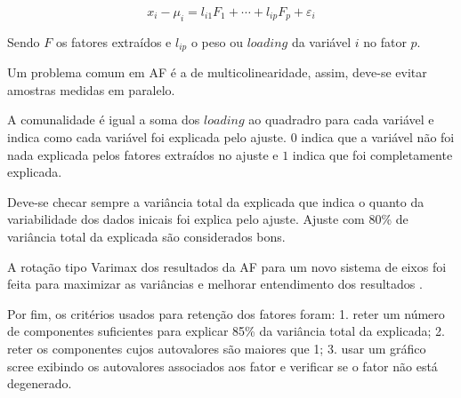 \begin{equation}
  \label{eq:af}
  x_i-\mu_i = l_{i1} F_1 + \cdots + l_{ip} F_p + \varepsilon_i 
\end{equation}

Sendo $F$ os fatores extraídos e $l_{ip}$ o peso ou $loading$ 
da variável $i$ no fator $p$.

Um problema comum em AF é a de multicolinearidade, assim, 
deve-se evitar amostras medidas em paralelo. 

A comunalidade é igual a soma dos $loading$ ao quadradro 
para cada variável e indica como cada variável foi explicada pelo ajuste. 
$0$ indica que a variável não foi nada explicada pelos fatores extraídos 
no ajuste e $1$ indica que foi completamente explicada.

Deve-se checar sempre a variância total da explicada que indica 
o quanto da variabilidade dos dados inicais foi explica pelo ajuste. 
Ajuste com 80\% de variância total da explicada são considerados bons. 

A rotação tipo Varimax dos resultados da AF 
para um novo sistema de eixos foi feita para maximizar as variâncias 
e melhorar entendimento dos resultados \citep{kaiser1958}.

Por fim, os critérios usados para retenção dos fatores foram:
1. reter um número de componentes suficientes para explicar 85\% da 
   variância total da explicada;
2. reter os componentes cujos autovalores são maiores que 1;
3. usar um gráfico scree exibindo os autovalores associados aos fator e
   verificar se o fator não está degenerado. 






